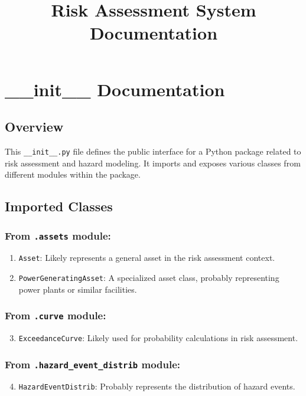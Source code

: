 \documentclass{article}
\title{Risk Assessment System Documentation}
\author{}
\date{}
\begin{document}
\maketitle
\tableofcontents
\newpage

\section{\_\_init\_\_ Documentation}

\subsection{Overview}

This \texttt{\_\_init\_\_.py} file defines the public interface for a Python package related to risk assessment and hazard modeling. It imports and exposes various classes from different modules within the package.

\subsection{Imported Classes}

\subsubsection{From \texttt{.assets} module:}
\begin{enumerate}
    \item \texttt{Asset}: Likely represents a general asset in the risk assessment context.
    \item \texttt{PowerGeneratingAsset}: A specialized asset class, probably representing power plants or similar facilities.
\end{enumerate}

\subsubsection{From \texttt{.curve} module:}
\begin{enumerate}\setcounter{enumi}{2}
    \item \texttt{ExceedanceCurve}: Likely used for probability calculations in risk assessment.
\end{enumerate}

\subsubsection{From \texttt{.hazard\_event\_distrib} module:}
\begin{enumerate}\setcounter{enumi}{3}
    \item \texttt{HazardEventDistrib}: Probably represents the distribution of hazard events.
\end{enumerate}
\end{document}
